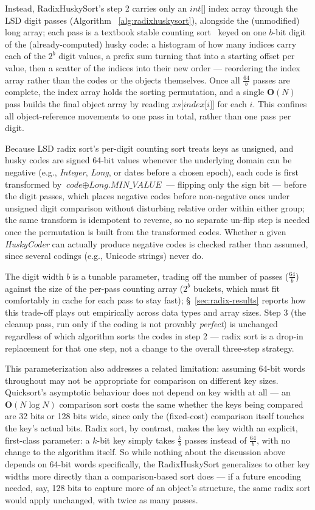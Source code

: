\documentclass[twoside,leqno,twocolumn]{article}
\begin{document}
Instead, RadixHuskySort's step 2 carries only an $\textit{int[]}$ index array through the LSD digit
passes (Algorithm ~\ref{alg:radixhuskysort}), alongside the (unmodified) long array;
each pass is a textbook stable counting sort~\cite{CLRS} keyed on one $b$-bit digit of the
(already-computed) husky code:
a histogram of how many indices carry each of the $2^b$ digit values, a prefix sum turning that into a
starting offset per value, then a scatter of the indices into their new order ---
reordering the index array rather than the codes or the objects themselves.
Once all $\frac{64}{b}$ passes are complete, the index array holds the sorting permutation,
and a single $\textbf{O}(N)$ pass builds the final object array by reading $\textit{xs[index[i]]}$ for each $i$.
This confines all object-reference movements to one pass in total, rather than one pass per digit.

Because LSD radix sort's per-digit counting sort treats keys as unsigned,
and husky codes are signed 64-bit values whenever the underlying domain can be negative (e.g., \textit{Integer},
\textit{Long}, or dates before a chosen epoch), each code is first transformed by $\textit{code} \oplus \textit{Long.MIN\_VALUE}$ —
flipping only the sign bit — before the digit passes,
which places negative codes before non-negative ones under unsigned digit comparison without disturbing relative order within either group;
the same transform is idempotent to reverse, so no separate un-flip step is needed once the permutation is built from the transformed codes.
Whether a given \textit{HuskyCoder} can actually produce negative codes is checked rather than assumed,
since several codings (e.g., Unicode strings) never do.

The digit width $b$ is a tunable parameter, trading off the number of passes ($\frac{64}{b}$)
against the size of the per-pass counting array ($2^b$ buckets, which must fit comfortably in cache for each pass to stay fast);
\S~\ref{sec:radix-results} reports how this trade-off plays out empirically across data types and array sizes.
Step 3 (the cleanup pass, run only if the coding is not provably \textit{perfect})
is unchanged regardless of which algorithm sorts the codes in step 2 —
radix sort is a drop-in replacement for that one step, not a change to the overall three-step strategy.

This parameterization also addresses a related limitation:
assuming 64-bit words throughout may not be appropriate for comparison on different key sizes.
Quicksort's asymptotic behaviour does not depend on key width at all —
an $\textbf{O}(N \log N)$ comparison sort costs the same whether the keys being compared are 32 bits or 128 bits wide,
since only the (fixed-cost) comparison itself touches the key's actual bits.
Radix sort, by contrast, makes the key width an explicit, first-class parameter:
a $k$-bit key simply takes $\frac{k}{b}$ passes instead of $\frac{64}{b}$, with no change to the algorithm itself.
So while nothing about the discussion above depends on 64-bit words specifically,
the RadixHuskySort generalizes to other key widths more directly than a comparison-based sort does —
if a future encoding needed, say, 128 bits to capture more of an object's structure,
the same radix sort would apply unchanged, with twice as many passes.
\end{document}
